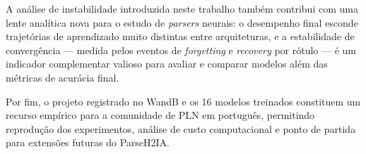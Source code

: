 A análise de instabilidade introduzida neste trabalho também contribui com uma lente analítica
nova para o estudo de \textit{parsers} neurais: o desempenho final esconde trajetórias de
aprendizado muito distintas entre arquiteturas, e a estabilidade de convergência — medida
pelos eventos de \textit{forgetting} e \textit{recovery} por rótulo — é um indicador
complementar valioso para avaliar e comparar modelos além das métricas de acurácia final.

Por fim, o projeto registrado no WandB e os 16 modelos treinados constituem um recurso
empírico para a comunidade de PLN em português, permitindo reprodução dos experimentos,
análise de custo computacional e ponto de partida para extensões futuras do ParseH2IA.
